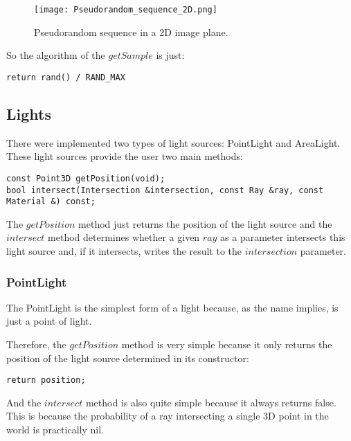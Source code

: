 \begin{figure}[H]
	\centering
	\caption{Pseudorandom sequence in a 2D image plane.}
	\label{Pseudorandom_sequence_2D.}
	\texttt{[image: Pseudorandom\_sequence\_2D.png]}
\end{figure}

\par
So the algorithm of the
$getSample$
is just:

\begin{lstlisting}
return rand() / RAND_MAX
\end{lstlisting}


\subsection{Lights}

\par
There were implemented two types of light sources: PointLight and AreaLight.
These light sources provide the user two main methods:

\begin{lstlisting}
const Point3D getPosition(void);
bool intersect(Intersection &intersection, const Ray &ray, const Material &) const;
\end{lstlisting}

\par
The
$getPosition$
method just returns the position of the light source and the 
$intersect$
method determines whether a given
$ray$
as a parameter intersects this light source and, if it intersects, writes the result to the
$intersection$
parameter.

\subsubsection{PointLight}

\par
The PointLight is the simplest form of a light because, as the name implies, is just a point of light.

\par
Therefore, the
$getPosition$
method is very simple because it only returns the position of the light source determined in its constructor:

\begin{lstlisting}
return position;
\end{lstlisting}

\par
And the
$intersect$
method is also quite simple because it always returns false.
This is because the probability of a ray intersecting a single 3D point in the world is practically nil.

